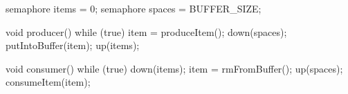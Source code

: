 \documentclass[varwidth=27.2em,crop]{standalone}
\begin{document}
\begin{ccode}
semaphore items = 0;
semaphore spaces = BUFFER_SIZE;        
\end{ccode}
\begin{minipage}{.42\linewidth}
\vspace{1em}
\begin{ccode}
void producer() {
  while (true) {
    item = produceItem();
    down(spaces);
    putIntoBuffer(item);
    up(items);
  }
}      
\end{ccode}
\end{minipage}\qquad
\begin{minipage}{.48\linewidth}
\vspace{1em}
\begin{ccode}
void consumer() {
  while (true) {
    down(items);
    item = rmFromBuffer();
    up(spaces);
    consumeItem(item);
  }
}
\end{ccode}  
\end{minipage}
\end{document}
